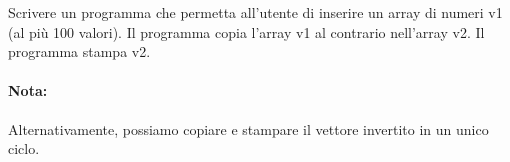 \begin{Exercise}[label={ex:inversione}]
  Scrivere un programma che permetta all'utente di inserire un array di numeri v1 (al più 100 valori). Il programma copia l'array v1 al contrario nell'array v2. Il programma stampa v2.
\end{Exercise}

\begin{Answer}[ref={ex:inversione}]
  
  \paragraph{Nota: } Alternativamente, possiamo copiare e stampare il vettore invertito in un unico ciclo.
  
\end{Answer}
